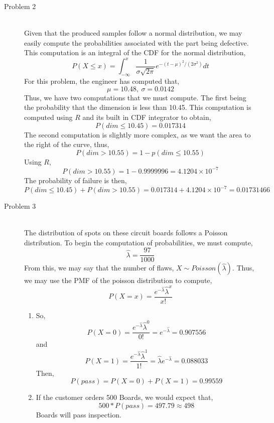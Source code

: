 \documentclass[letterpaper,10pt]{article}
\begin{document}
\begin{description}
\item[Problem 2]\hfill \\
Given that the produced samples follow a normal distribution, we may easily compute the probabilities associated with the part being defective. This computation is an integral of the CDF for the normal distribution,
\[P(X\leq x)=\int_{-\infty}^{x}\frac{1}{\sigma\sqrt{2\pi}}e^{-(t-\mu)^2/(2\sigma^2)}dt\]
For this problem, the engineer has computed that,
\[\mu=10.48,\ \sigma=0.0142\]
Thus, we have two computations that we must compute. The first being the probability that the dimension is less than 10.45. This computation is computed using $R$ and its built in CDF integrator to obtain,
\[P(dim \leq 10.45)=0.017314\]
The second computation is slightly more complex, as we want the area to the right of the curve, thus,
\[P(dim > 10.55)=1-p(dim\leq 10.55)\]
Using $R$,
\[P(dim > 10.55)=1-0.9999996=4.1204\times10^{-7}\]
The probability of failure is then,
\[P(dim \leq 10.45)+P(dim > 10.55)=0.017314+4.1204\times10^{-7}=0.01731466\]
\item[Problem 3]\hfill \\
The distribution of spots on these circuit boards follows a Poisson distribution. To begin the computation of probabilities, we must compute,
\[\hat{\lambda}=\frac{97}{1000}\]
From this, we may say that the number of flaws, $X\sim Poisson(\hat{\lambda})$. Thus, we may use the PMF of the poisson distribution to compute,
\[P(X=x)=\frac{e^{-\hat{\lambda}}\hat{\lambda}^x}{x!}\]
\begin{enumerate}
\item So,
\[P(X=0)=\frac{e^{-\hat{\lambda}}\hat{\lambda}^0}{0!}=e^{-\hat{\lambda}}=0.907556\]
and
\[P(X=1)=\frac{e^{-\hat{\lambda}}\hat{\lambda}^1}{1!}=\hat{\lambda}e^{-\hat{\lambda}}=0.088033\]
Then,
\[P(pass)=P(X=0)+P(X=1)=0.99559\]
\item If the customer orders 500 Boards, we would expect that,
\[500*P(pass)=497.79\approx 498\]
Boards will pass inspection.
\end{enumerate}
\end{description}
\end{document}
